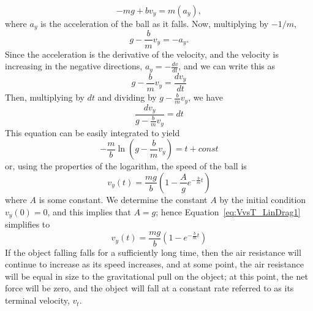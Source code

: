 $$- m g + b v_y = m(a_y),$$
where $a_y$ is the acceleration of the ball as it falls. Now, multiplying by $-1/m$,
$$ g - \frac{b}{m} v_y = -a_y .$$
Since the acceleration is the derivative of the velocity, and the velocity is increasing in the negative directions, $a_y = -\frac{dv}{dt}$, and we can write this as 
\begin{equation}
	g - \frac{b}{m} v_y = \frac{d v_y}{dt}
	\label{eq-diffeqLinDrag}
\end{equation}
Then, multiplying by $dt$ and dividing by $g - \frac{b}{m} v_y$, we have
$$
	\frac{dv_y}{g - \frac{b}{m} v_y} = dt
$$
This equation can be easily integrated to yield 
$$
-\frac{m}{b}\ln\left(g - \frac{b}{m} v_y\right) = t + const
$$
or, using the properties of the logarithm, the speed of the ball is 
\begin{equation}
v_{y} (t) = \frac{mg}{b}\left(1-\frac{A}{g}e^{-\frac{b}{m}t}\right)
\label{eq:VvsT_LinDrag1}
\end{equation}
where $A$ is some constant. We determine the constant $A$ by the initial condition $v_y(0) = 0$, and this implies that $A=g$; hence Equation~\ref{eq:VvsT_LinDrag1} simplifies to
\begin{equation}
v_{y} (t) = \frac{mg}{b}\left(1-e^{-\frac{b}{m}t}\right)
\label{eq:VvsT_LinDrag2}
\end{equation}
If the object falling falls for a sufficiently long time, then the air resistance will continue to increase as its speed increases, and at some point, the air resistance will be equal in size to the gravitational pull on the object; at this point, the net force will be zero, and the object will fall at a constant rate referred to as its terminal velocity, $v_t$. 

